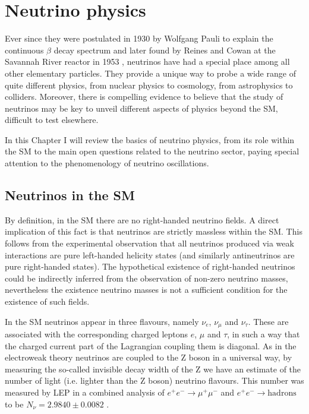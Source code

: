 \chapter{Neutrino physics}
\label{chapter:neutrinos}

\begin{comment}
\begin{chapquote}{Terry Pratchett, \textit{Sourcery}}
	Little particles of inspiration sleet through the universe all the time traveling through the densest matter in the same way that a neutrino passes through a candyfloss haystack, and most of them miss.
\end{chapquote}
\end{comment}
	
Ever since they were postulated in 1930 by Wolfgang Pauli to explain the continuous $\beta$ decay spectrum \cite{Pauli1930} and later found by Reines and Cowan at the Savannah River reactor in 1953 \cite{Reines1953}, neutrinos have had a special place among all other elementary particles. They provide a unique way to probe a wide range of quite different physics, from nuclear physics to cosmology, from astrophysics to colliders. Moreover, there is compelling evidence to believe that the study of neutrinos may be key to unveil different aspects of physics beyond the SM, difficult to test elsewhere.

In this Chapter I will review the basics of neutrino physics, from its role within the SM to the main open questions related to the neutrino sector, paying special attention to the phenomenology of neutrino oscillations.

\section{Neutrinos in the SM}

By definition, in the SM there are no right-handed neutrino fields. A direct implication of this fact is that neutrinos are strictly massless within the SM. This follows from the experimental observation that all neutrinos produced via weak interactions are pure left-handed helicity states (and similarly antineutrinos are pure right-handed states). The hypothetical existence of right-handed neutrinos could be indirectly inferred from the observation of non-zero neutrino masses, nevertheless the existence neutrino masses is not a sufficient condition for the existence of such fields.

In the SM neutrinos appear in three flavours, namely $\nu_{e}$, $\nu_{\mu}$ and $\nu_{\tau}$. These are associated with the corresponding charged leptons $e$, $\mu$ and $\tau$, in such a way that the charged current part of the Lagrangian coupling them is diagonal. As in the electroweak theory neutrinos are coupled to the Z boson in a universal way, by measuring the so-called invisible decay width of the Z we have an estimate of the number of light (i.e. lighter than the Z boson) neutrino flavours. This number was measured by LEP in a combined analysis of $e^{+}e^{-} \rightarrow \mu^{+}\mu^{-}$ and $e^{+}e^{-} \rightarrow \mathrm{hadrons}$ to be $N_{\nu} = 2.9840 \pm 0.0082$ \cite{ALEPH2005}.

